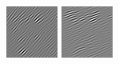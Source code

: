 \begin{figure}
\begin{center}
  \includegraphics[width=\columnwidth/9]{ch4/figures/imag_-1_2.jpg}
  \includegraphics[width=\columnwidth/9]{ch4/figures/imag_-1_3.jpg}

\end{center}
\end{figure}
